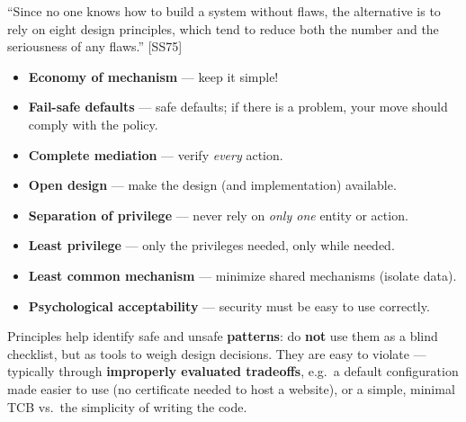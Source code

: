 \begin{keybox}[title=Summary]
``Since no one knows how to build a system without flaws, the alternative is to rely on
eight design principles, which tend to reduce both the number and the seriousness of any
flaws.'' [SS75]
\begin{itemize}
  \item \textbf{Economy of mechanism} --- keep it simple!
  \item \textbf{Fail-safe defaults} --- safe defaults; if there is a problem, your move
        should comply with the policy.
  \item \textbf{Complete mediation} --- verify \emph{every} action.
  \item \textbf{Open design} --- make the design (and implementation) available.
  \item \textbf{Separation of privilege} --- never rely on \emph{only one} entity or
        action.
  \item \textbf{Least privilege} --- only the privileges needed, only while needed.
  \item \textbf{Least common mechanism} --- minimize shared mechanisms (isolate data).
  \item \textbf{Psychological acceptability} --- security must be easy to use correctly.
\end{itemize}
Principles help identify safe and unsafe \textbf{patterns}: do \textbf{not} use them as a
blind checklist, but as tools to weigh design decisions. They are easy to violate ---
typically through \textbf{improperly evaluated tradeoffs}, e.g.\ a default configuration made
easier to use (no certificate needed to host a website), or a simple, minimal TCB vs.\ the
simplicity of writing the code.
\end{keybox}

